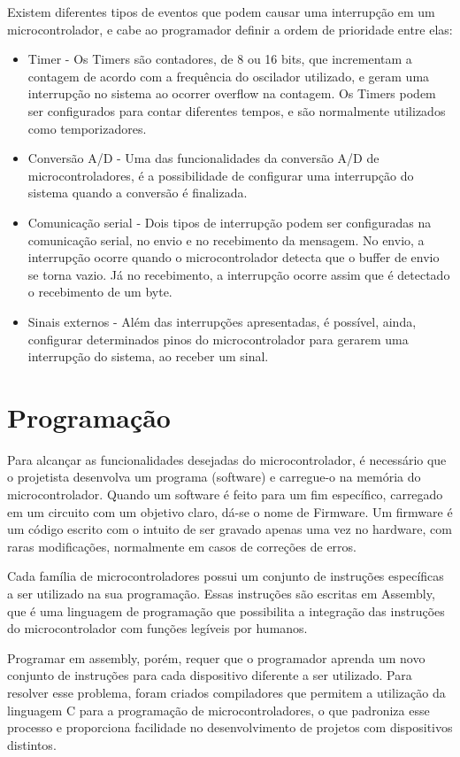 Existem diferentes tipos de eventos que podem causar uma interrupção em um microcontrolador, e cabe ao programador definir a ordem de prioridade entre elas:
\begin{itemize}
\item Timer - Os Timers são contadores, de 8 ou 16 bits, que incrementam a contagem de acordo com a frequência do oscilador utilizado, e geram uma interrupção no sistema ao ocorrer overflow na contagem. Os Timers podem ser configurados para contar diferentes tempos, e são normalmente utilizados como temporizadores.
\item Conversão A/D - Uma das funcionalidades da conversão A/D de microcontroladores, é a possibilidade de configurar uma interrupção do sistema quando a conversão é finalizada.
\item Comunicação serial - Dois tipos de interrupção podem ser configuradas na comunicação serial, no envio e no recebimento da mensagem. No envio, a interrupção ocorre quando o microcontrolador detecta que o buffer de envio se torna vazio. Já no recebimento, a interrupção ocorre assim que é detectado o recebimento de um byte.
\item Sinais externos - Além das interrupções apresentadas, é possível, ainda, configurar determinados pinos do microcontrolador para gerarem uma interrupção do sistema, ao receber um sinal.
\end{itemize}

\section{Programação}

Para alcançar as funcionalidades desejadas do microcontrolador, é necessário que o projetista desenvolva um programa (software) e carregue-o na memória do microcontrolador. Quando um software é feito para um fim específico, carregado em um circuito com um objetivo claro, dá-se o nome de Firmware. Um firmware é um código escrito com o intuito de ser gravado apenas uma vez no hardware, com raras modificações, normalmente em casos de correções de erros.

Cada família de microcontroladores possui um conjunto de instruções específicas a ser utilizado na sua programação. Essas instruções são escritas em Assembly, que é uma linguagem de programação que possibilita a integração das instruções do microcontrolador com funções legíveis por humanos.

Programar em assembly, porém, requer que o programador aprenda um novo conjunto de instruções para cada dispositivo diferente a ser utilizado. Para resolver esse problema, foram criados compiladores que permitem a utilização da linguagem C para a programação de microcontroladores, o que padroniza esse processo e proporciona facilidade no desenvolvimento de projetos com dispositivos distintos.



